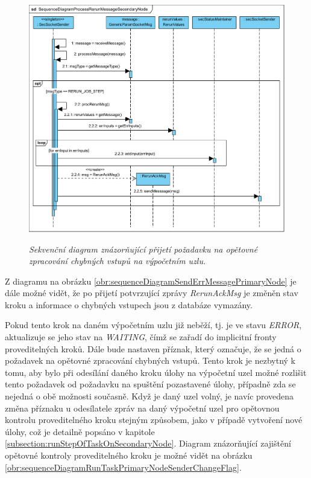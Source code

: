 \begin{figure}[H]
\begin{center}
    \scalebox{0.5}
    {
        \includegraphics{images/SequenceDiagramProcessRerunMessageSecondaryNode.pdf}
    }
    \caption{\label{obr:sequenceDiagramProcessRerunMessageSecondaryNode} {\it Sekvenční diagram znázorňující přijetí požadavku na opětovné zpracování chybných vstupů na výpočetním uzlu.}}
\end{center}
\end{figure}

Z diagramu na obrázku \ref{obr:sequenceDiagramSendErrMessagePrimaryNode} je dále možné vidět, že po přijetí potvrzující zprávy \textit{RerunAckMsg} je změněn stav kroku a informace o chybných vstupech jsou z databáze vymazány.


Pokud tento krok na daném výpočetním uzlu již neběží, tj. je ve stavu \textit{ERROR}, aktualizuje se jeho stav na \textit{WAITING}, čímž se zařadí do implicitní fronty proveditelných kroků. Dále bude nastaven příznak, který označuje, že se jedná o požadavek na opětovné zpracování chybných vstupů. Tento krok je nezbytný k tomu, aby bylo při odesílání daného kroku úlohy na výpočetní uzel možné rozlišit tento požadavek od požadavku na spuštění pozastavené úlohy, případně zda se nejedná o obě možnosti současně. Když je daný uzel volný, je navíc provedena změna příznaku u odesílatele zpráv na daný výpočetní uzel pro opětovnou kontrolu proveditelného kroku stejným způsobem, jako v případě vytvoření nové úlohy, což je detailně popsáno v kapitole \ref{subsection:runStepOfTaskOnSecondaryNode}. Diagram znázorňující zajištění opětovné kontroly proveditelného kroku je možné vidět na obrázku \ref{obr:sequenceDiagramRunTaskPrimaryNodeSenderChangeFlag}.

